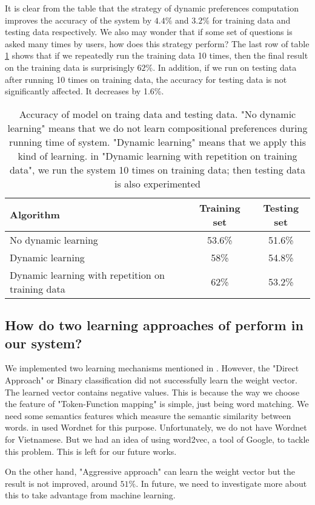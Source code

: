 It is clear from the table that the strategy of dynamic preferences computation improves the accuracy of the system by $4.4\%$ and $3.2\%$ for training data and testing data respectively. We also may wonder that if some set of questions is asked many times by users, how does this strategy perform? The last row of table \ref{d-c-p-eff} shows that if we repeatedly run the training data 10 times, then the final result on the training data is surprisingly $62\%$. In addition, if we run on testing data after running 10 times on training data, the accuracy for testing data is not significantly affected. It decreases by 1.6\%. 
\begin{table}[h] 
	\begin{center}
	    \begin{tabular}{| p{5cm} | c | c |}
	    \hline
	    Algorithm & Training set & Testing set \\ \hline
		No dynamic learning & 53.6\% & 51.6\%  \\ \hline
	    Dynamic learning & 58\% & 54.8\%  \\ \hline
	    Dynamic learning with repetition on training data & 62\% & 53.2\%  \\
	    \hline
	    \end{tabular}        
	\end{center}
	\scriptsize
	\caption{Accuracy of model on traing data and testing data. "No dynamic learning" means that we do not learn compositional preferences during running time of system. "Dynamic learning" means that we apply this kind of learning. in "Dynamic learning with repetition on training data", we run the system 10 times on training data; then testing data is also experimented}
    \label{d-c-p-eff}
\end{table}

\subsection{How do two learning approaches of \cite{Clarke:2010:DSP:1870568.1870571} perform in our system?}
We implemented two learning mechanisms mentioned in \cite{Clarke:2010:DSP:1870568.1870571}. However, the "Direct Approach" or Binary classification did not successfully learn the weight vector. The learned vector contains negative values. This is because the way we choose the feature of "Token-Function mapping" is simple, just being word matching. We need some semantics features which measure the semantic similarity between words. \citeauthor{Clarke:2010:DSP:1870568.1870571} in \cite{Clarke:2010:DSP:1870568.1870571} used Wordnet for this purpose. Unfortunately, we do not have Wordnet for Vietnamese. But we had an idea of using word2vec, a tool of Google, to tackle this problem. This is left for our future works.

On the other hand, "Aggressive approach" can learn the weight vector but the result is not improved, around $51\%$. In future, we need to investigate more about this to take advantage from machine learning.